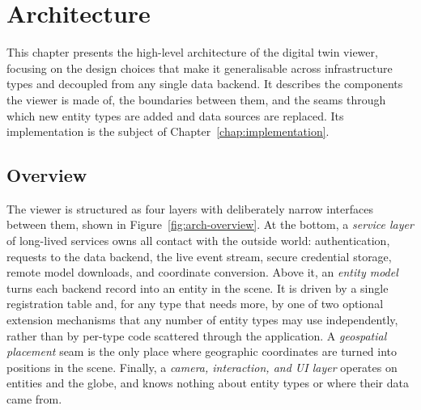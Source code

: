 \chapter{Architecture}
\label{chap:architecture}

\begin{introduction}
This chapter presents the high-level architecture of the digital twin viewer, focusing on the design choices that make it generalisable across infrastructure types and decoupled from any single data backend. It describes the components the viewer is made of, the boundaries between them, and the seams through which new entity types are added and data sources are replaced. Its implementation is the subject of Chapter~\ref{chap:implementation}.
\end{introduction}

\section{Overview}
\label{sec:arch-overview}

The viewer is structured as four layers with deliberately narrow interfaces between them, shown in Figure~\ref{fig:arch-overview}. At the bottom, a \emph{service layer} of long-lived services owns all contact with the outside world: authentication, requests to the data backend, the live event stream, secure credential storage, remote model downloads, and coordinate conversion. Above it, an \emph{entity model} turns each backend record into an entity in the scene. It is driven by a single registration table and, for any type that needs more, by one of two optional extension mechanisms that any number of entity types may use independently, rather than by per-type code scattered through the application. A \emph{geospatial placement} seam is the only place where geographic coordinates are turned into positions in the scene. Finally, a \emph{camera, interaction, and UI layer} operates on entities and the globe, and knows nothing about entity types or where their data came from.

